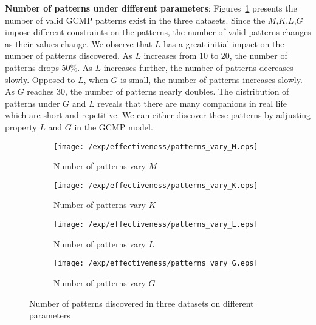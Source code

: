 \textbf{Number of patterns under different parameters}: Figures~\ref{exp:patterns_vary} presents
 the number of valid GCMP patterns exist in the three datasets. Since the $M$,$K$,$L$,$G$
 impose different constraints on the patterns, the number of valid patterns changes as their 
 values change. We observe that $L$ has a great initial impact on the number of patterns
 discovered. As $L$ increases from $10$ to $20$, the number of patterns drops 50\%. As $L$
 increases further, the number of patterns decreases slowly. Opposed to $L$, when $G$
 is small, the number of patterns increases slowly. As $G$ reaches $30$, 
 the number of patterns nearly doubles. The distribution of patterns under $G$ and $L$
 reveals that there are many companions in real life which are short and repetitive. We can
 either discover these patterns by adjusting property $L$ and $G$ in the GCMP model.


\begin{figure}[h]
\centering
 	 \begin{subfigure}[b]{0.23\textwidth}
        \texttt{[image: /exp/effectiveness/patterns\_vary\_M.eps]}
        \caption{Number of patterns vary $M$}
    \end{subfigure}
    \begin{subfigure}[b]{0.23\textwidth}
        \texttt{[image: /exp/effectiveness/patterns\_vary\_K.eps]}
        \caption{Number of patterns vary $K$}
    \end{subfigure}  
    \begin{subfigure}[b]{0.23\textwidth}
        \texttt{[image: /exp/effectiveness/patterns\_vary\_L.eps]}
        \caption{Number of patterns vary $L$}
    \end{subfigure}
    \begin{subfigure}[b]{0.23\textwidth}
        \texttt{[image: /exp/effectiveness/patterns\_vary\_G.eps]}
        \caption{Number of patterns vary $G$}
    \end{subfigure}    
\caption{Number of patterns discovered in three datasets on different parameters}
\label{exp:patterns_vary}
\end{figure}



